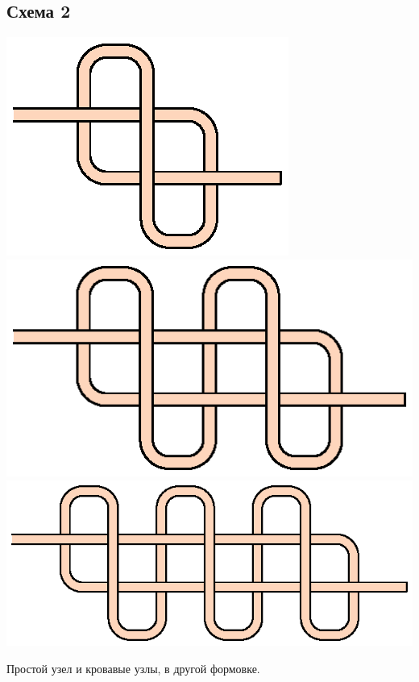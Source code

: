 \subsection{Схема 2}
\graphicspath{{\currentpath}}

\includegraphics[scale=0.5]{images/s-02-a0.eps}
\includegraphics[scale=0.5]{images/s-02-a1.eps}
\includegraphics[scale=0.5]{images/s-02-a2.eps}

Простой узел и кровавые узлы, в другой формовке.